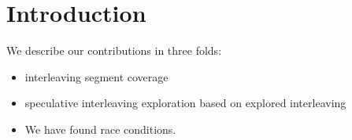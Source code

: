 \section{Introduction}
\label{s:intro}






We describe our contributions in three folds:

\begin{itemize}
\item interleaving segment coverage
\item speculative interleaving exploration based on explored interleaving
\item We have found \totalbugs race conditions.
\end{itemize}

